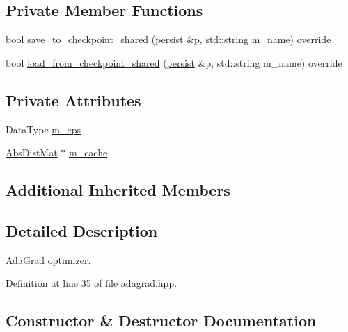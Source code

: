 \subsection*{Private Member Functions}
\begin{DoxyCompactItemize}
\item 
bool \hyperlink{classlbann_1_1adagrad_a94282e58af6bb1e9af27255e23bd3d3d}{save\+\_\+to\+\_\+checkpoint\+\_\+shared} (\hyperlink{classlbann_1_1persist}{persist} \&p, std\+::string m\+\_\+name) override
\item 
bool \hyperlink{classlbann_1_1adagrad_ac6b6eb0c4d393679f69281c072dbc4fa}{load\+\_\+from\+\_\+checkpoint\+\_\+shared} (\hyperlink{classlbann_1_1persist}{persist} \&p, std\+::string m\+\_\+name) override
\end{DoxyCompactItemize}
\subsection*{Private Attributes}
\begin{DoxyCompactItemize}
\item 
Data\+Type \hyperlink{classlbann_1_1adagrad_aace057f88a46dab327f6409716dbe8de}{m\+\_\+eps}
\item 
\hyperlink{base_8hpp_a9a697a504ae84010e7439ffec862b470}{Abs\+Dist\+Mat} $\ast$ \hyperlink{classlbann_1_1adagrad_a5eaf0d220d2be78d91455ba85eef3e9a}{m\+\_\+cache}
\end{DoxyCompactItemize}
\subsection*{Additional Inherited Members}


\subsection{Detailed Description}
Ada\+Grad optimizer. 

Definition at line 35 of file adagrad.\+hpp.



\subsection{Constructor \& Destructor Documentation}
\mbox{\label{classlbann_1_1adagrad_a26d826ba89053481a26573a592ff2f8a}} 
